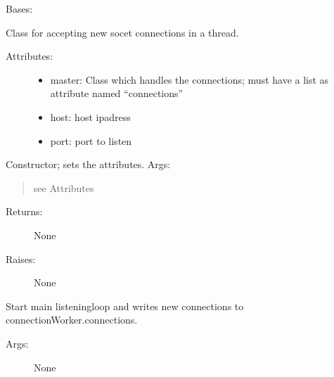 \documentclass[letterpaper,10pt,english]{sphinxmanual}
\begin{document}

\begin{fulllineitems}
\label{communicationUtilities:communicationUtilities.ConnectionAcceptor}
Bases: 

Class for accepting new socet connections in a thread.
\begin{description}
\item[{Attributes:}] \leavevmode\begin{itemize}
\item {} 
master: Class which handles the connections; must have a list as attribute named ``connections''

\item {} 
host: host ipadress

\item {} 
port: port to listen

\end{itemize}

\end{description}

\begin{fulllineitems}
\label{communicationUtilities:communicationUtilities.ConnectionAcceptor.__init__}
Constructor; sets the attributes.
Args:
\begin{quote}

see Attributes
\end{quote}
\begin{description}
\item[{Returns:}] \leavevmode
None

\item[{Raises:}] \leavevmode
None

\end{description}

\end{fulllineitems}


\begin{fulllineitems}
\label{communicationUtilities:communicationUtilities.ConnectionAcceptor.run}
Start main listeningloop and writes new connections to connectionWorker.connections.
\begin{description}
\item[{Args:}] \leavevmode
None


\end{description}
\end{fulllineitems}
\end{fulllineitems}
\end{document}
